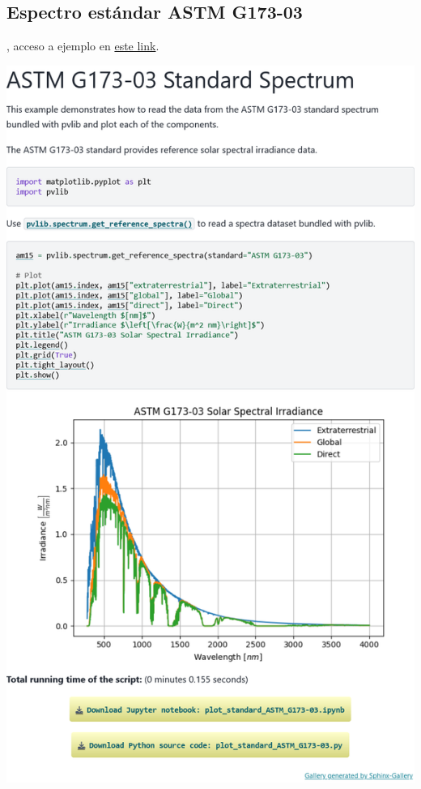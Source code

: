 \begin{myparindent}{0pt}
\newpage\section{Espectro estándar ASTM G173-03} \label{sct:doc_ej_espectro_astm}

, acceso a ejemplo en \href{https://pvlib-python.readthedocs.io/en/latest/gallery/spectrum/plot_standard_ASTM_G173-03.html}{este link}.

\includegraphics[width=\linewidth,height=0.9\textheight,keepaspectratio]{images/docs_examples/plot_standard_ASTM_G173-03.png}


\end{myparindent}
